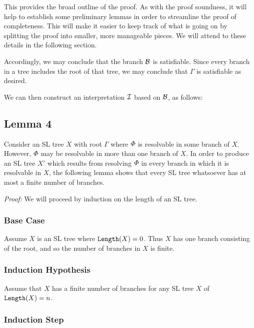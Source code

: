 This provides the broad outline of the proof.
As with the proof soundness, it will help to establish some preliminary lemmas in order to streamline the proof of completeness.
This will make it easier to keep track of what is going on by splitting the proof into smaller, more manageable pieces.
We will attend to these details in the following section.


Accordingly, we may conclude that the branch $\mathcal{B}$ is satisfiable.
Since every branch in a tree includes the root of that tree, we may conclude that $\Gamma$ is satisfiable as desired. 

We can then construct an interpretation $\mathcal{I}$ based on $\mathcal{B}$, as follows: 


\subsection{Lemma 4}

Consider an SL tree $X$ with root $\Gamma$ where $\varPhi$ is resolvable in some branch of $X$. 
However, $\varPhi$ may be resolvable in more than one branch of $X$. 
In order to produce an SL tree $X'$ which results from resolving $\varPhi$ in every branch in which it is resolvable in $X$, the following lemma shows that every SL tree whatsoever has at most a finite number of branches.

\label{FiniteBranchLemma}

\textit{Proof:}
We will proceed by induction on the length of an SL tree.

\subsubsection{Base Case}

Assume $X$ is an SL tree where $\texttt{Length}(X)=0$. 
Thus $X$ has one branch consisting of the root, and so the number of branches in $X$ is finite. 




\subsubsection{Induction Hypothesis}

Assume that $X$ has a finite number of branches for any SL tree $X$ of $\texttt{Length}(X)=n$. 


\subsubsection{Induction Step}

